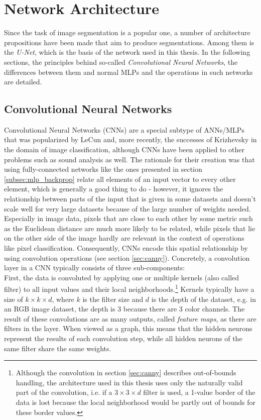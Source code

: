 \chapter {Network Architecture}

Since the task of image segmentation is a popular one, a number of architecture propositions have been made that aim to produce segmentations. Among them is the \textit{U-Net}, which is the basis of the network used in this thesis.  In the following sections, the principles behind so-called \textit{Convolutional Neural Networks}, the differences between them and normal MLPs and the operations in such networks are detailed.


	\section{Convolutional Neural Networks}
\label{sec:CNN}
Convolutional Neural Networks (CNNs) are a special subtype of ANNs/MLPs that was popularized by LeCun \cite{lecun98} and, more recently, the successes of Krizhevsky \cite{krizhevsky2012} in the domain of image classification, although CNNs have been applied to other problems such as sound analysis as well. The rationale for their creation was that using fully-connected networks like the ones presented in section \ref{subsec:mlp_backprop} relate all elements of an input vector to every other element, which is generally a good thing to do - however, it ignores the relationship between parts of the input that is given in some datasets and doesn't scale well for very large datasets because of the large number of weights needed. Especially in image data, pixels that are close to each other by some metric such as the Euclidean distance are much more likely to be related, while pixels that lie on the other side of the image hardly are relevant in the context of operations like pixel classification. Consequently, CNNs encode this spatial relationship by using convolution operations (see section \ref{sec:canny}). Concretely, a convolution layer in a CNN typically consists of three sub-components:\\

\noindent First, the data is convoluted by applying one or multiple kernels (also called filter) to all input values and their local neighborhoods.\footnote{Although the convolution in section \ref{sec:canny} describes out-of-bounds handling, the architecture used in this thesis uses only the naturally valid part of the convolution, i.e. if a $3 \times 3 \times d$ filter is used, a 1-value border of the data is lost because the local neighborhood would be partly out of bounds for these border values.} Kernels typically have a size of $k \times k \times d$, where $k$ is the filter size and $d$ is the depth of the dataset, e.g. in an RGB image dataset, the depth is 3 because there are 3 color channels. The result of these convolutions are as many outputs, called \textit{feature maps}, as there are filters in the layer. When viewed as a graph, this means that the hidden neurons represent the results of each convolution step, while all hidden neurons of the same filter share the same weights.

